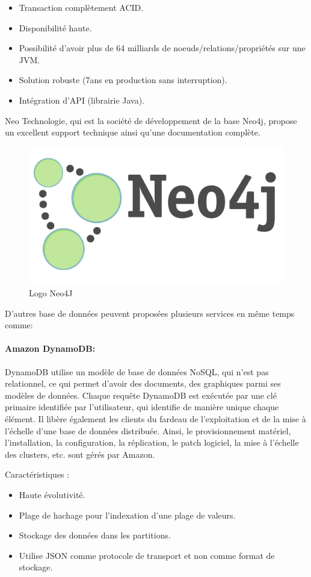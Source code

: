 \begin{itemize}[label=]
\item Transaction complètement ACID.
\item Disponibilité haute.
\item Possibilité d’avoir plus de 64 milliards de noeuds/relations/propriétés sur une JVM.
\item Solution robuste (7ans en production sans interruption).
\item Intégration d’API (librairie Java).
\end{itemize}

Neo Technologie, qui est la société de développement de la base Neo4j, propose un excellent support technique ainsi qu’une documentation complète.

\begin{figure}[h]
	\centering
    \includegraphics[scale=0.3]{img/part1/4.12}
    \caption{Logo Neo4J}
\end{figure}

\newpage 
\begin{center}
\color[rgb]{0.2, 0.6, 0.2} D'autres base de données peuvent proposées plusieurs services en même temps comme: 
\end{center} 

\paragraph{Amazon DynamoDB:}
DynamoDB utilise un modèle de base de données NoSQL, qui n'est pas relationnel, ce qui permet d'avoir des documents, des graphiques parmi ses modèles de données.  Chaque requête DynamoDB est exécutée par une clé primaire identifiée par l'utilisateur, qui identifie de manière unique chaque élément. Il libère également les clients du fardeau de l'exploitation et de la mise à l'échelle d'une base de données distribuée. Ainsi, le provisionnement matériel, l'installation, la configuration, la réplication, le patch logiciel, la mise à l'échelle des clusters, etc. sont gérés par Amazon.

Caractéristiques :
\begin{itemize}[label=]
\item Haute évolutivité.
\item Plage de hachage pour l'indexation d'une plage de valeurs.
\item Stockage des données dans les partitions.
\item Utilise JSON comme protocole de transport et non comme format de stockage.
\end{itemize}